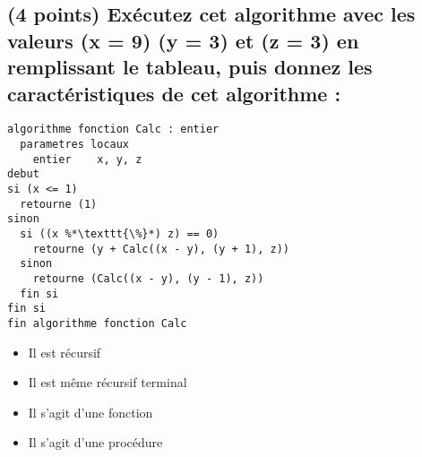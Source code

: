 \documentclass[11pt,a4paper]{article}
\begin{document}


\subsection{(4 points) Exécutez cet algorithme avec les valeurs (x = 9) (y = 3) et (z = 3) en remplissant le tableau, puis donnez les caractéristiques de cet algorithme : }


\begin{table}[!ht]
  \centering
  \begin{minipage}{0.645\textwidth}
    \centering

\begin{lstlisting}[style=algorithmique]
algorithme fonction Calc : entier
  parametres locaux
    entier    x, y, z
debut
si (x <= 1)
  retourne (1)
sinon
  si ((x %*\texttt{\%}*) z) == 0)
    retourne (y + Calc((x - y), (y + 1), z))
  sinon
    retourne (Calc((x - y), (y - 1), z))
  fin si
fin si
fin algorithme fonction Calc \end{lstlisting}

\begin{itemize}
  \item[\checkmark] Il est récursif  \phantom{Lg}\\
  \item[\CaseCoche] Il est même récursif terminal  \phantom{Lg}\\
  \item[\checkmark] Il s'agit d'une fonction  \phantom{Lg}\\
  \item[\CaseCoche] Il s'agit d'une procédure  \phantom{Lg}\\
\end{itemize}


  \end{minipage}
  \hfillx
  \begin{minipage}{0.33\textwidth}
    \centering


\end{minipage}
\end{table}
\end{document}
